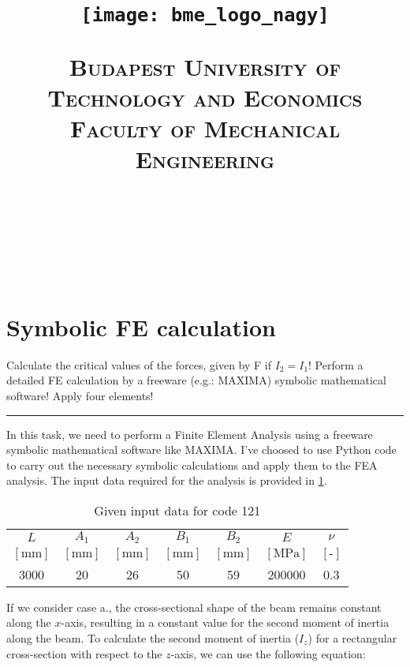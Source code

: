 \documentclass[12pt]{article}
\title{\centering \texttt{[image: bme\_logo\_nagy]}
\bigskip

\normalfont \normalsize \textsc{\centering Budapest University of Technology and Economics
\\ Faculty of Mechanical Engineering} \\ [12pt] \horrule{0.5pt} \\[0.4cm] \huge \HFCIME{} \\ \horrule{2pt} \\[0.5cm]}
\author{\NEV{}}
\newcommand{\horrule}[1]{\rule{\linewidth}{#1}}
\begin{document}

\pagebreak
\maketitle
\pagebreak

\pagebreak
\tableofcontents
\newpage
\section{Symbolic FE calculation}
Calculate the critical values of the forces, given by F if $I_2 = I_1$! Perform a detailed FE calculation by a freeware (e.g.: MAXIMA) symbolic mathematical software! Apply four elements!\\
\horrule{0.4pt}
\medskip


\noindent In this task, we need to perform a Finite Element Analysis using a freeware symbolic mathematical software like MAXIMA. I've choosed to use Python code to carry out the necessary symbolic calculations and apply them to the FEA analysis. The input data required for the analysis is provided in \ref{tab:Data}.

\begin{table} [h!]
\center
\caption{Given input data for code 121}
\label{tab:Data}
\renewcommand{\arraystretch}{1.2}
\begin{tabular}{c c c c c c c}
$L$ & $A_1$ & $A_2$ &  $B_1$ & $B_2$ & $E$ & $\nu$                      \\ 
$\left[ \text{mm} \right]$ & $\left[ \text{mm} \right]$ &$\left[ \text{mm} \right]$ &$\left[ \text{mm} \right]$ &$\left[ \text{mm} \right]$ &$\left[ \text{MPa} \right]$ & $\left[ \text{-} \right]$ \\[0.1cm] \hline 
3000 & 20 &  26 & 50 & 59 & 200000 & 0.3                               
\end{tabular}
\end{table}

\noindent If we consider case a., the cross-sectional shape of the beam remains constant along the $x$-axis, resulting in a constant value for the second moment of inertia along the beam. To calculate the second moment of inertia ($I_z$) for a rectangular cross-section with respect to the $z$-axis, we can use the following equation: 
\end{document}
